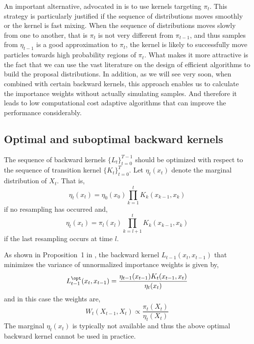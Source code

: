 An important alternative, advocated in \cite{DelMoral:2006hc} is to use \mcmc
kernels targeting $\pi_t$. This strategy is particularly justified if the
sequence of distributions moves smoothly or the kernel is fast mixing. When
the sequence of distributions moves slowly from one to another, that is
$\pi_t$ is not very different from $\pi_{t-1}$, and thus samples from
$\eta_{t-1}$ is a good approximation to $\pi_t$, the kernel is likely to
successfully move particles towards high probability regions of $\pi_t$. What
makes it more attractive is the fact that we can use the vast literature on
the design of efficient \mcmc algorithms to build the proposal distributions.
In addition, as we will see very soon, when combined with certain backward
kernels, this approach enables us to calculate the importance weights without
actually simulating samples. And therefore it leads to low computational cost
adaptive algorithms that can improve the performance considerably.

\subsection{Optimal and suboptimal backward kernels}
\label{sub:Optimal and suboptimal backward kernels}

The sequence of backward kernels $\{L_t\}_{t=0}^{T-1}$ should be optimized
with respect to the sequence of transition kernel $\{K_t\}_{t=0}^T$. Let
$\eta_t(x_t)$ denote the marginal distribution of $X_t$. That is,
\begin{equation}
  \eta_t(x_t) = \eta_0(x_0)\prod_{k=1}^tK_k(x_{k-1},x_k)
\end{equation}
if no resampling has occurred and,
\begin{equation}
  \eta_t(x_t) = \pi_l(x_l)\prod_{k=l+1}^tK_k(x_{k-1},x_k)
\end{equation}
if the last resampling occurs at time $l$.

As shown in Proposition~1{} in \cite{DelMoral:2006hc}, the backward kernel
$L_{t-1}(x_t, x_{t-1})$ that minimizes the variance of unnormalized importance
weights is given by,
\begin{equation}
  L_{t-1}^{\opt}(x_t,x_{t-1}) =
  \frac{\eta_{t-1}(x_{t-1})K_t(x_{t-1},x_t)}{\eta_t(x_t)}
\end{equation}
and in this case the weights are,
\begin{equation}
  W_t(X_{t-1},X_t) \propto \frac{\pi_t(X_t)}{\eta_t(X_t)}
\end{equation}
The marginal $\eta_t(x_t)$ is typically not available and thus the above
optimal backward kernel cannot be used in practice.

